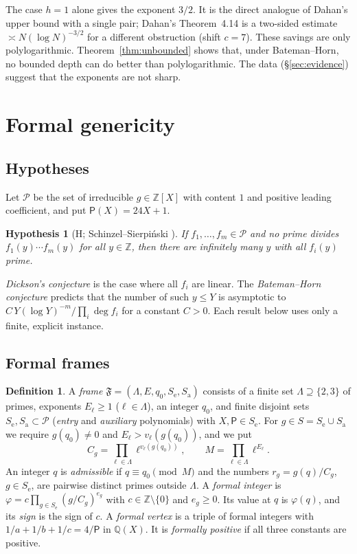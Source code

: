 \documentclass[11pt,reqno]{amsart}
\newtheorem{hypothesis}[theorem]{Hypothesis}
\theoremstyle{definition}
\newtheorem{definition}[theorem]{Definition}
\newcommand{\Z}{\mathbb Z}
\newcommand{\Q}{\mathbb Q}
\newcommand{\Pp}{\mathsf P}
\newcommand{\cP}{\mathcal P}
\newcommand{\cF}{\mathfrak F}
\newcommand{\Se}{S_{\mathrm e}}
\newcommand{\Sa}{S_{\mathrm a}}
\begin{document}
The case $h=1$ alone gives the exponent $3/2$.  It is the direct analogue of
Dahan's upper bound \cite[Thm.~4.3]{Dahan} with a single pair; Dahan's
Theorem~4.14 is a two-sided estimate $\asymp N(\log N)^{-3/2}$ for a different
obstruction (shift $c=7$).  These savings are only polylogarithmic.
Theorem~\ref{thm:unbounded} shows that, under Bateman--Horn, no bounded
depth can do better than polylogarithmic.  The data (\S\ref{sec:evidence})
suggest that the exponents are not sharp.

\section{Formal genericity}\label{sec:formal}

\subsection{Hypotheses}
Let $\cP$ be the set of irreducible $g\in\Z[X]$ with content $1$ and positive
leading coefficient, and put $\Pp(X)=24X+1$.

\begin{hypothesis}[H; Schinzel--Sierpi\'nski \cite{SS}]
If $f_1,\dots,f_m\in\cP$ and no prime divides $f_1(y)\cdots f_m(y)$ for
all $y\in\Z$, then there are infinitely many $y$ with all $f_i(y)$ prime.
\end{hypothesis}

\emph{Dickson's conjecture} \cite{Dickson} is the case where all $f_i$ are
linear.  The \emph{Bateman--Horn conjecture} \cite{BH} predicts that
the number of such $y\le Y$ is asymptotic to
$C\,Y(\log Y)^{-m}/\prod_i\deg f_i$ for a constant $C>0$.  Each result below uses
only a finite, explicit instance.

\subsection{Formal frames}

\begin{definition}\label{def:frame}
A \emph{frame} $\cF=(\Lambda,E,q_0,\Se,\Sa)$ consists of a finite set
$\Lambda\supseteq\{2,3\}$ of primes, exponents $E_\ell\ge1$
($\ell\in\Lambda$), an integer $q_0$, and finite disjoint sets
$\Se,\Sa\subset\cP$ (\emph{entry} and \emph{auxiliary} polynomials) with
$X,\Pp\in\Se$.  For $g\in S=\Se\cup\Sa$ we require $g(q_0)\ne0$ and
$E_\ell>v_\ell(g(q_0))$, and we put
\[
 C_g=\prod_{\ell\in\Lambda}\ell^{v_\ell(g(q_0))},\qquad M=\prod_{\ell\in\Lambda}\ell^{E_\ell}.
\]
An integer $q$ is \emph{admissible} if $q\equiv q_0\pmod M$ and the numbers
$r_g=g(q)/C_g$, $g\in\Se$, are pairwise distinct primes outside $\Lambda$.
A \emph{formal integer} is $\varphi=c\prod_{g\in\Se}(g/C_g)^{e_g}$ with
$c\in\Z\setminus\{0\}$ and $e_g\ge0$.  Its value at $q$ is $\varphi(q)$,
and its \emph{sign} is the sign of $c$.  A \emph{formal vertex} is a triple of
formal integers with $1/a+1/b+1/c=4/\Pp$ in $\Q(X)$.  It is
\emph{formally positive} if all three constants are positive.
\end{definition}
\end{document}
